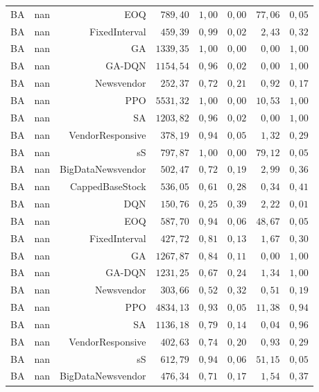\begin{table}[htb]
\begin{tabular}{llrrrrrr}
BA & nan & EOQ & $789{,}40$ & $1{,}00$ & $0{,}00$ & $77{,}06$ & $0{,}05$ \\
BA & nan & FixedInterval & $459{,}39$ & $0{,}99$ & $0{,}02$ & $2{,}43$ & $0{,}32$ \\
BA & nan & GA & $1339{,}35$ & $1{,}00$ & $0{,}00$ & $0{,}00$ & $1{,}00$ \\
BA & nan & GA-DQN & $1154{,}54$ & $0{,}96$ & $0{,}02$ & $0{,}00$ & $1{,}00$ \\
BA & nan & Newsvendor & $252{,}37$ & $0{,}72$ & $0{,}21$ & $0{,}92$ & $0{,}17$ \\
BA & nan & PPO & $5531{,}32$ & $1{,}00$ & $0{,}00$ & $10{,}53$ & $1{,}00$ \\
BA & nan & SA & $1203{,}82$ & $0{,}96$ & $0{,}02$ & $0{,}00$ & $1{,}00$ \\
BA & nan & VendorResponsive & $378{,}19$ & $0{,}94$ & $0{,}05$ & $1{,}32$ & $0{,}29$ \\
BA & nan & sS & $797{,}87$ & $1{,}00$ & $0{,}00$ & $79{,}12$ & $0{,}05$ \\
BA & nan & BigDataNewsvendor & $502{,}47$ & $0{,}72$ & $0{,}19$ & $2{,}99$ & $0{,}36$ \\
BA & nan & CappedBaseStock & $536{,}05$ & $0{,}61$ & $0{,}28$ & $0{,}34$ & $0{,}41$ \\
BA & nan & DQN & $150{,}76$ & $0{,}25$ & $0{,}39$ & $2{,}22$ & $0{,}01$ \\
BA & nan & EOQ & $587{,}70$ & $0{,}94$ & $0{,}06$ & $48{,}67$ & $0{,}05$ \\
BA & nan & FixedInterval & $427{,}72$ & $0{,}81$ & $0{,}13$ & $1{,}67$ & $0{,}30$ \\
BA & nan & GA & $1267{,}87$ & $0{,}84$ & $0{,}11$ & $0{,}00$ & $1{,}00$ \\
BA & nan & GA-DQN & $1231{,}25$ & $0{,}67$ & $0{,}24$ & $1{,}34$ & $1{,}00$ \\
BA & nan & Newsvendor & $303{,}66$ & $0{,}52$ & $0{,}32$ & $0{,}51$ & $0{,}19$ \\
BA & nan & PPO & $4834{,}13$ & $0{,}93$ & $0{,}05$ & $11{,}38$ & $0{,}94$ \\
BA & nan & SA & $1136{,}18$ & $0{,}79$ & $0{,}14$ & $0{,}04$ & $0{,}96$ \\
BA & nan & VendorResponsive & $402{,}63$ & $0{,}74$ & $0{,}20$ & $0{,}93$ & $0{,}29$ \\
BA & nan & sS & $612{,}79$ & $0{,}94$ & $0{,}06$ & $51{,}15$ & $0{,}05$ \\
BA & nan & BigDataNewsvendor & $476{,}34$ & $0{,}71$ & $0{,}17$ & $1{,}54$ & $0{,}37$ \\

\end{tabular}
\end{table}
